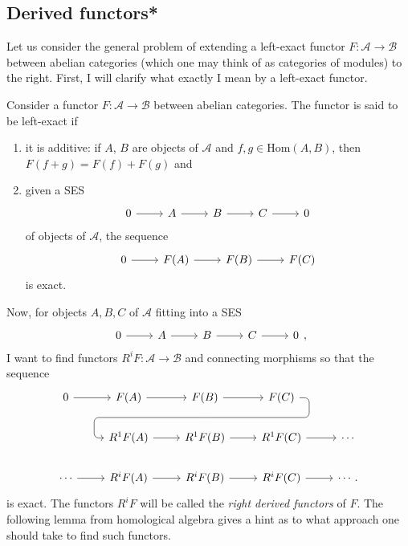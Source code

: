 \subsection{Derived functors*}
Let us consider the general problem of extending a left-exact
functor $F:\mathcal{A}\to\mathcal{B}$ between abelian categories
(which one may think of as categories of modules) to the right.
First, I will clarify what exactly I mean by a left-exact functor.
\begin{defin}
  Consider a functor $F:\mathcal{A}\to\mathcal{B}$ between abelian
  categories. The functor is said to be left-exact if
  \begin{enumerate}
    \item it is additive: if $A$, $B$ are objects of $\mathcal{A}$
          and $f, g\in\text{Hom}(A, B)$, then $F(f+g)=F(f)+F(g)$ and
    \item given a SES
          \[\begin{tikzcd}
              0\rar & A\rar & B\rar & C\rar & 0
            \end{tikzcd}\]
          of objects of $\mathcal{A}$, the sequence
          \[\begin{tikzcd}
              0\rar & F(A)\rar & F(B)\rar & F(C)
            \end{tikzcd}\]
          is exact.
  \end{enumerate}
\end{defin}
Now, for objects $A,B,C$ of $\mathcal{A}$ fitting into a SES
\[\begin{tikzcd}
    0\rar & A\rar & B\rar & C\rar & 0
  \end{tikzcd},\]
I want to find functors $R^{i}F:\mathcal{A}\to\mathcal{B}$ and
connecting morphisms so that the sequence
\[
\begin{tikzcd}
  0 \rar & F(A) \rar & F(B)
  \rar\dar[phantom, ""{coordinate, name=Z}] & F(C)
  \arrow[rounded corners, to path={ -- ([xshift=2ex]\tikztostart.east)
    |- (Z) -| ([xshift=-2ex]\tikztotarget.west) -- (\tikztotarget)},
  overlay]{dll} & \\
  & R^{1}F(A)\rar & R^{1}F(B)\rar
  & R^{1}F(C)\rar & \cdots \\
  \cdots\rar & R^{i}F(A)\rar & R^{i}F(B)\rar
  & R^{i}F(C)\rar & \cdots.
\end{tikzcd}
\]
is exact. The functors $R^{i}F$ will be called the \emph{right
  derived functors} of $F$. The following lemma from homological
algebra gives a hint as to what approach one should take to find such functors.
